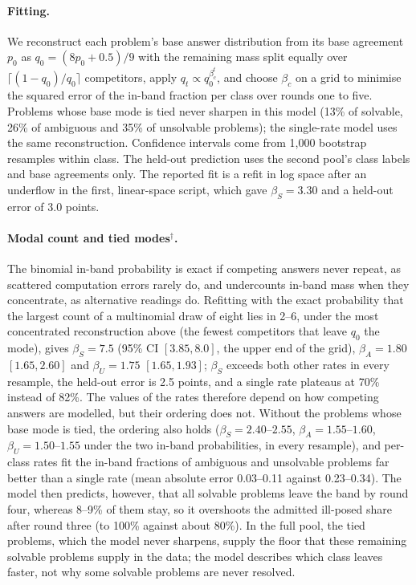 \paragraph{Fitting.} We reconstruct each problem's base answer distribution from its base agreement $p_0$ as $q_0 = (8 p_0 + 0.5)/9$ with the remaining mass split equally over $\lceil (1-q_0)/q_0 \rceil$ competitors, apply $q_t \propto q_0^{\beta_c^t}$, and choose $\beta_c$ on a grid to minimise the squared error of the in-band fraction per class over rounds one to five. Problems whose base mode is tied never sharpen in this model (13\% of solvable, 26\% of ambiguous and 35\% of unsolvable problems); the single-rate model uses the same reconstruction. Confidence intervals come from 1,000 bootstrap resamples within class. The held-out prediction uses the second pool's class labels and base agreements only. The reported fit is a refit in log space after an underflow in the first, linear-space script, which gave $\beta_S = 3.30$ and a held-out error of 3.0 points.

\paragraph{Modal count and tied modes$^{\dagger}$.} The binomial in-band probability is exact if competing answers never repeat, as scattered computation errors rarely do, and undercounts in-band mass when they concentrate, as alternative readings do. Refitting with the exact probability that the largest count of a multinomial draw of eight lies in 2--6, under the most concentrated reconstruction above (the fewest competitors that leave $q_0$ the mode), gives $\beta_S = 7.5$ (95\% CI $[3.85, 8.0]$, the upper end of the grid), $\beta_A = 1.80$ $[1.65, 2.60]$ and $\beta_U = 1.75$ $[1.65, 1.93]$; $\beta_S$ exceeds both other rates in every resample, the held-out error is 2.5 points, and a single rate plateaus at 70\% instead of 82\%. The values of the rates therefore depend on how competing answers are modelled, but their ordering does not. Without the problems whose base mode is tied, the ordering also holds ($\beta_S = 2.40$--$2.55$, $\beta_A = 1.55$--$1.60$, $\beta_U = 1.50$--$1.55$ under the two in-band probabilities, in every resample), and per-class rates fit the in-band fractions of ambiguous and unsolvable problems far better than a single rate (mean absolute error 0.03--0.11 against 0.23--0.34). The model then predicts, however, that all solvable problems leave the band by round four, whereas 8--9\% of them stay, so it overshoots the admitted ill-posed share after round three (to 100\% against about 80\%). In the full pool, the tied problems, which the model never sharpens, supply the floor that these remaining solvable problems supply in the data; the model describes which class leaves faster, not why some solvable problems are never resolved.

